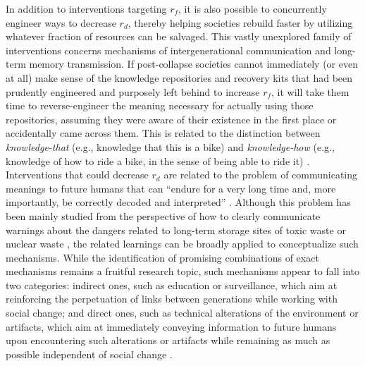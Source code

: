 In addition to interventions targeting $r_f$, it is also possible to concurrently engineer ways to decrease $r_d$, thereby helping societies rebuild faster by utilizing whatever fraction of resources can be salvaged. This vastly unexplored family of interventions concerns mechanisms of intergenerational communication and long-term memory transmission. If post-collapse societies cannot immediately (or even at all) make sense of the knowledge repositories and recovery kits that had been prudently engineered and purposely left behind to increase $r_f$, it will take them time to reverse-engineer the meaning necessary for actually using those repositories, assuming they were aware of their existence in the first place or accidentally came across them. This is related to the distinction between \emph{knowledge-that} (e.g., knowledge that this is a bike) and \emph{knowledge-how} (e.g., knowledge of how to ride a bike, in the sense of being able to ride it) \citep{Ren2012-kh}. Interventions that could decrease $r_d$ are related to the problem of communicating meanings to future humans that can ``endure for a very long time and, more importantly, be correctly decoded and interpreted'' \citep{Mazzucchelli2022-lf}. Although this problem has been mainly studied from the perspective of how to clearly communicate warnings about the dangers related to long-term storage sites of toxic waste \citep{Sandlos2019-gm} or nuclear waste \citep{Keating2023-ns}, the related learnings can be broadly applied to conceptualize such mechanisms. While the identification of promising combinations of exact mechanisms remains a fruitful research topic, such mechanisms appear to fall into two categories: indirect ones, such as education or surveillance, which aim at reinforcing the perpetuation of links between generations while working with social change; and direct ones, such as technical alterations of the environment or artifacts, which aim at immediately conveying information to future humans upon encountering such alterations or artifacts while remaining as much as possible independent of social change \citep{Calla2023-ww}.

